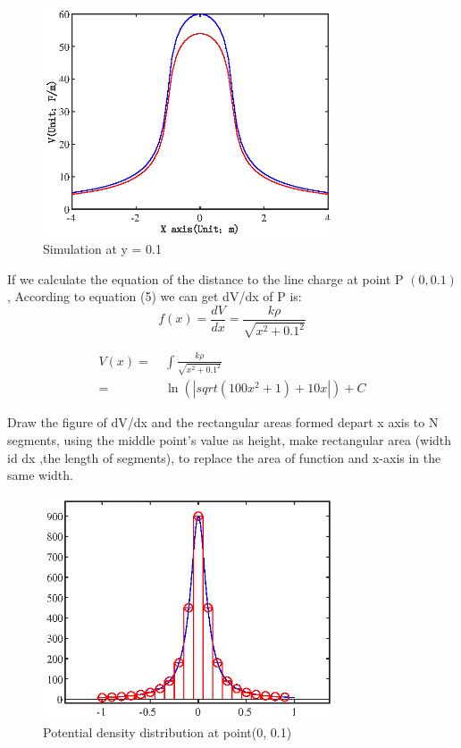 \documentclass[10pt, journal, final]{IEEEtran}
\begin{document}


\begin{figure}[htbp]
    \centering
    \includegraphics[width = 3.4in]{figures/fig3.2.eps}
    \caption{Simulation at y = 0.1}
    \label{fig:3.2}
\end{figure}

If we calculate the equation of the distance to the line charge at point P $(0, 0.1)$,
According to equation (5) we can get dV/dx of P is:
\begin{equation}
    f(x) = \frac{dV}{dx} = \frac{k \rho}{\sqrt{x^2+0.1^2}}
\end{equation}

\begin{equation}
    \begin{aligned}
        V(x) = & \ \int{\frac{k \rho}{\sqrt{x^2+0.1^2}}}       \\
        =      & \ \ln(\left| sqrt(100x^2+1) +10x \right|) + C
    \end{aligned}
\end{equation}

Draw the figure of dV/dx and the rectangular areas formed
depart x axis to N segments, using the middle point's value as height,
make rectangular area (width id dx ,the length of segments),
to replace the area of function and x-axis in the same width.



\begin{figure}[htbp]
    \centering
    \includegraphics[width = 3.4in]{figures/fig3.3.eps}
    \caption{Potential density distribution at point(0, 0.1)}
    \label{fig:3.3}
\end{figure}
\end{document}
